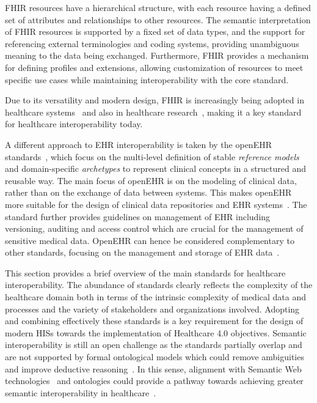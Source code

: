 
\ac{FHIR} resources have a hierarchical structure, with each resource having a defined set of attributes and relationships to other resources.
%
The semantic interpretation of \ac{FHIR} resources is supported by a fixed set of data types, and the support for referencing external terminologies and coding systems, providing unambiguous meaning to the data being exchanged.
%
Furthermore, \ac{FHIR} provides a mechanism for defining profiles and extensions, allowing customization of resources to meet specific use cases while maintaining interoperability with the core standard. 

Due to its versatility and modern design, \ac{FHIR} is increasingly being adopted in healthcare systems~\cite{Ayaz_Pasha_Alzahrani_Budiarto_Stiawan_2021} and also in healthcare research~\cite{Vorisek_Lehne_Klopfenstein_Mayer_Bartschke_Haese_Thun_2022}, making it a key standard for healthcare interoperability today.

A different approach to \ac{EHR} interoperability is taken by the openEHR standards~\cite{openEHR_architecture_overview}, which focus on the multi-level definition of stable \emph{reference models} and domain-specific \emph{archetypes} to represent clinical concepts in a structured and reusable way.
%
The main focus of openEHR is on the modeling of clinical data, rather than on the exchange of data between systems.
%
This makes openEHR more suitable for the design of clinical data repositories and \ac{EHR} systems~\cite{Delussu_Frexia_Mascia_Sulis_Meloni_Del_Rio_Lianas_2024}.
%
The standard further provides guidelines on management of \ac{EHR} including versioning, auditing and access control which are crucial for the management of sensitive medical data. 
%
OpenEHR can hence be considered complementary to other standards, focusing on the management and storage of \ac{EHR} data~\cite{Bosca_Moner_Maldonado_Robles_2015,Pedrera-Jiménez_García-Barrio_Frid_Moner_Boscá-Tomás_Lozano-Rubí_Kalra_Beale_Muñoz-Carrero_Serrano-Balazote_2023}. 

This section provides a brief overview of the main standards for healthcare interoperability. 
%
The abundance of standards clearly reflects the complexity of the healthcare domain both in terms of the intrinsic complexity of medical data and processes and the variety of stakeholders and organizations involved.
%
Adopting and combining effectively these standards is a key requirement for the design of modern \acp{HIS} towards the implementation of Healthcare 4.0 objectives.
%
Semantic interoperability is still an open challenge as the standards partially overlap and are not supported by formal ontological models which could remove ambiguities and improve deductive reasoning~\cite{de_Mello_Rigo_da_Costa_da_Rosa_Righi_Donida_Bez_Schunke_2022}.
%
In this sense, alignment with Semantic Web technologies~\cite{berners2023semantic} and ontologies could provide a pathway towards achieving greater semantic interoperability in healthcare~\cite{Schulz_Martínez-Costa_2013}.

